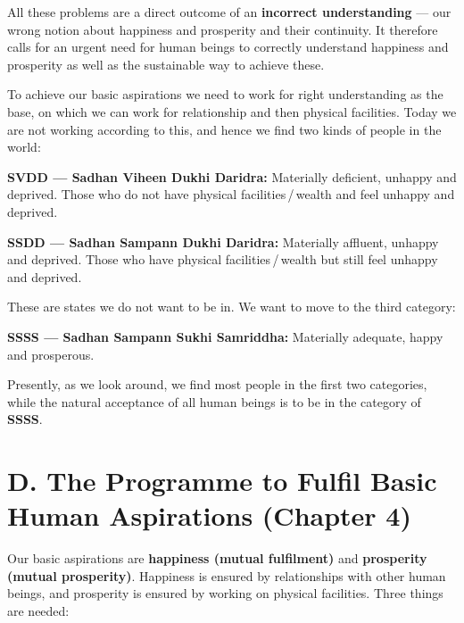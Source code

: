 All these problems are a direct outcome of an \textbf{incorrect
understanding} --- our wrong notion about happiness and prosperity and their
continuity. It therefore calls for an urgent need for human beings to
correctly understand happiness and prosperity as well as the sustainable way
to achieve these.


\ans To achieve our basic aspirations we need to work for right understanding
as the base, on which we can work for relationship and then physical
facilities. Today we are not working according to this, and hence we find two
kinds of people in the world:

\begin{apts}
\item \textbf{SVDD --- Sadhan Viheen Dukhi Daridra:} Materially deficient,
      unhappy and deprived. Those who do not have physical
      facilities\,/\,wealth and feel unhappy and deprived.
\item \textbf{SSDD --- Sadhan Sampann Dukhi Daridra:} Materially affluent,
      unhappy and deprived. Those who have physical facilities\,/\,wealth but
      still feel unhappy and deprived.
\end{apts}

These are states we do not want to be in. We want to move to the third
category:

\begin{keybox}
\textbf{SSSS --- Sadhan Sampann Sukhi Samriddha:} Materially adequate, happy
and prosperous.
\end{keybox}

Presently, as we look around, we find most people in the first two categories,
while the natural acceptance of all human beings is to be in the category of
\textbf{SSSS}.

\section{D. The Programme to Fulfil Basic Human Aspirations (Chapter 4)}


\ans Our basic aspirations are \textbf{happiness (mutual fulfilment)} and
\textbf{prosperity (mutual prosperity)}. Happiness is ensured by relationships
with other human beings, and prosperity is ensured by working on physical
facilities. Three things are needed:

